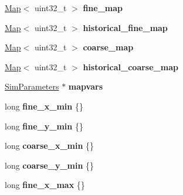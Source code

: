 \begin{DoxyCompactItemize}
\item 
\hyperlink{class_map}{Map}$<$ uint32\+\_\+t $>$ {\bfseries fine\+\_\+map}\hypertarget{class_landscape_a8947e46b9be54b42a93fb0792d4a9ed4}{}\label{class_landscape_a8947e46b9be54b42a93fb0792d4a9ed4}

\item 
\hyperlink{class_map}{Map}$<$ uint32\+\_\+t $>$ {\bfseries historical\+\_\+fine\+\_\+map}\hypertarget{class_landscape_a5e34fe2e75c3b84657a4edc75f9fcdec}{}\label{class_landscape_a5e34fe2e75c3b84657a4edc75f9fcdec}

\item 
\hyperlink{class_map}{Map}$<$ uint32\+\_\+t $>$ {\bfseries coarse\+\_\+map}\hypertarget{class_landscape_a58c8bb6432b578dac46bdbdba9e759c9}{}\label{class_landscape_a58c8bb6432b578dac46bdbdba9e759c9}

\item 
\hyperlink{class_map}{Map}$<$ uint32\+\_\+t $>$ {\bfseries historical\+\_\+coarse\+\_\+map}\hypertarget{class_landscape_a5ac41db1c48869d974c97393eb548dd8}{}\label{class_landscape_a5ac41db1c48869d974c97393eb548dd8}

\item 
\hyperlink{struct_sim_parameters}{Sim\+Parameters} $\ast$ {\bfseries mapvars}\hypertarget{class_landscape_aa3de03e94cea3c560df40bfa78b79f54}{}\label{class_landscape_aa3de03e94cea3c560df40bfa78b79f54}

\item 
long {\bfseries fine\+\_\+x\+\_\+min} \{\}\hypertarget{class_landscape_a95634ae0e15826160ad5c58a4093130d}{}\label{class_landscape_a95634ae0e15826160ad5c58a4093130d}

\item 
long {\bfseries fine\+\_\+y\+\_\+min} \{\}\hypertarget{class_landscape_a90e7fe904c80133338ac19aa13534ef9}{}\label{class_landscape_a90e7fe904c80133338ac19aa13534ef9}

\item 
long {\bfseries coarse\+\_\+x\+\_\+min} \{\}\hypertarget{class_landscape_a39dba789588465fe23055988ac52f217}{}\label{class_landscape_a39dba789588465fe23055988ac52f217}

\item 
long {\bfseries coarse\+\_\+y\+\_\+min} \{\}\hypertarget{class_landscape_a23b1484f4694fbc2a7c79af8d5e3fce5}{}\label{class_landscape_a23b1484f4694fbc2a7c79af8d5e3fce5}

\item 
long {\bfseries fine\+\_\+x\+\_\+max} \{\}\hypertarget{class_landscape_ac52242e6c558deb9a80478497d7320bc}{}\label{class_landscape_ac52242e6c558deb9a80478497d7320bc}


\end{DoxyCompactItemize}
